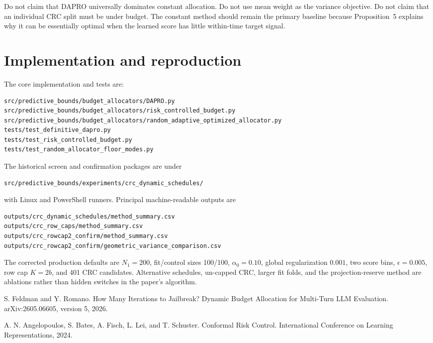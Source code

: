 \documentclass[10pt]{article}
\begin{document}
Do not claim that DAPRO universally dominates constant allocation.  Do not
use mean weight as the variance objective.  Do not claim that an individual
CRC split must be under budget.  The constant method should remain the primary
baseline because Proposition~5 explains why it can be essentially optimal
when the learned score has little within-time target signal.

\section{Implementation and reproduction}

The core implementation and tests are:
\begin{verbatim}
src/predictive_bounds/budget_allocators/DAPRO.py
src/predictive_bounds/budget_allocators/risk_controlled_budget.py
src/predictive_bounds/budget_allocators/random_adaptive_optimized_allocator.py
tests/test_definitive_dapro.py
tests/test_risk_controlled_budget.py
tests/test_random_allocator_floor_modes.py
\end{verbatim}

The historical screen and confirmation packages are under
\begin{verbatim}
src/predictive_bounds/experiments/crc_dynamic_schedules/
\end{verbatim}
with Linux and PowerShell runners.  Principal machine-readable outputs are
\begin{verbatim}
outputs/crc_dynamic_schedules/method_summary.csv
outputs/crc_row_caps/method_summary.csv
outputs/crc_rowcap2_confirm/method_summary.csv
outputs/crc_rowcap2_confirm/geometric_variance_comparison.csv
\end{verbatim}

The corrected production defaults are $N_1=200$, fit/control sizes 100/100,
$\alpha_0=0.10$, global regularization $0.001$, two score bins,
$\epsilon=0.005$, row cap $K=2b$, and 401 CRC candidates.  Alternative
schedules, un-capped CRC, larger fit folds, and the projection-reserve method
are ablations rather than hidden switches in the paper's algorithm.

\begin{thebibliography}{2}
S. Feldman and Y. Romano.
\newblock How Many Iterations to Jailbreak? Dynamic Budget Allocation for
Multi-Turn LLM Evaluation.
\newblock arXiv:2605.06605, version 5, 2026.

A. N. Angelopoulos, S. Bates, A. Fisch, L. Lei, and T. Schuster.
\newblock Conformal Risk Control.
\newblock International Conference on Learning Representations, 2024.
\end{thebibliography}
\end{document}
